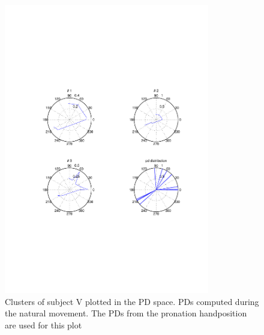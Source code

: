 \begin{figure}[ht]
    \centering
        \includegraphics[width=0.8\textwidth]{images/center_rose_vega.pdf}
    \caption{Clusters of subject V plotted in the PD space. PDs computed during the natural movement. The PDs from the pronation handposition are used for this plot}
    \label{sg:fig:images_center_rose_vega}
\end{figure}




